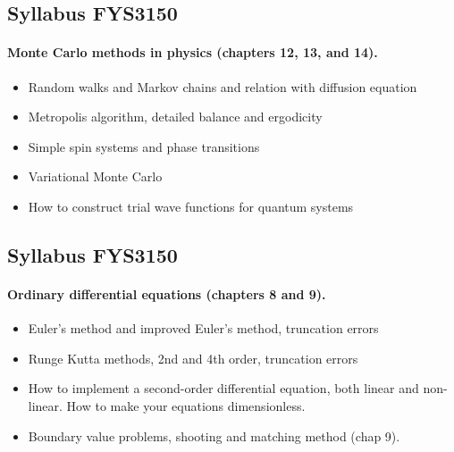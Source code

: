 \documentclass[%
oneside,                 %
final,                   %
10pt]{article}
\begin{document}
\noindent




\subsection*{Syllabus FYS3150}


\paragraph{Monte Carlo methods in physics (chapters 12, 13, and 14).}
\begin{itemize}
  \item Random walks and Markov chains and relation with diffusion equation

  \item Metropolis algorithm, detailed balance and ergodicity

  \item Simple spin systems and phase transitions

  \item Variational Monte Carlo

  \item How to construct trial wave functions for quantum systems
\end{itemize}

\noindent




\subsection*{Syllabus FYS3150}


\paragraph{Ordinary differential equations (chapters 8 and 9).}
\begin{itemize}
  \item Euler's method and improved Euler's method, truncation errors

  \item Runge Kutta methods, 2nd and 4th order, truncation errors

  \item How to implement a second-order differential equation, both linear and non-linear. How to make your equations dimensionless.

  \item Boundary value problems, shooting and matching method (chap 9).
\end{itemize}
\end{document}
